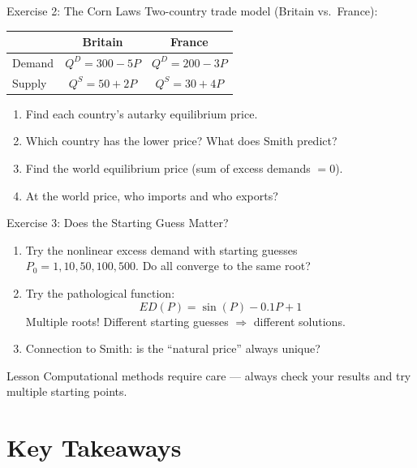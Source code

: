 \documentclass[aspectratio=169, 10pt]{beamer}
\begin{document}
\begin{frame}{Exercise 2: The Corn Laws}
Two-country trade model (Britain vs.\ France):
\vspace{0.3em}
\begin{center}
\begin{tabular}{lcc}
\toprule
 & Britain & France \\
\midrule
Demand & $Q^D = 300 - 5P$ & $Q^D = 200 - 3P$ \\
Supply & $Q^S = 50 + 2P$  & $Q^S = 30 + 4P$ \\
\bottomrule
\end{tabular}
\end{center}
\vspace{0.5em}
\begin{enumerate}
  \item Find each country's autarky equilibrium price.
  \item Which country has the lower price? What does Smith predict?
  \item Find the world equilibrium price (sum of excess demands $= 0$).
  \item At the world price, who imports and who exports?
\end{enumerate}
\end{frame}

\begin{frame}{Exercise 3: Does the Starting Guess Matter?}
\begin{enumerate}
  \item Try the nonlinear excess demand with starting guesses\\
        $P_0 = 1, 10, 50, 100, 500$. Do all converge to the same root?
  \item Try the pathological function:
  \[
    ED(P) = \sin(P) - 0.1P + 1
  \]
  Multiple roots! Different starting guesses $\Rightarrow$ different solutions.
  \item Connection to Smith: is the ``natural price'' always unique?
\end{enumerate}
\vspace{0.5em}
\begin{alertblock}{Lesson}
Computational methods require care --- always check your results
and try multiple starting points.
\end{alertblock}
\end{frame}

\section{Key Takeaways}
\end{document}
